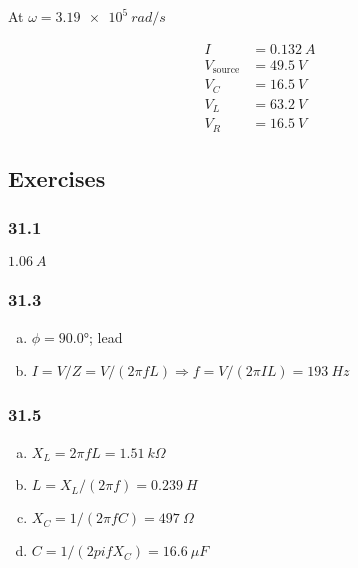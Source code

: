 \documentclass{article}
\begin{document}
\begin{enumerate}[(a)]
        At $\omega = \qty{3.19e5}{rad/s}$

        \begin{align*}
          I               & = \qty{0.132}{A} \\
          V_\text{source} & = \qty{49.5}{V}  \\
          V_C             & = \qty{16.5}{V}  \\
          V_L             & = \qty{63.2}{V}  \\
          V_R             & = \qty{16.5}{V}
        \end{align*}
\end{enumerate}

\subsection{Exercises}

\subsubsection{31.1}

$\qty{1.06}{A}$

\subsubsection{31.3}

\begin{enumerate}[(a)]
  \item $\phi = \ang{90.0}$; lead

  \item $I = V / Z = V / (2 \pi f L) \Rightarrow f = V / (2 \pi I L) = \qty{193}{Hz}$
\end{enumerate}

\subsubsection{31.5}

\begin{enumerate}[(a)]
  \item $X_L = 2 \pi f L = \qty{1.51}{k \Omega}$

  \item $L = X_L / (2 \pi f) = \qty{0.239}{H}$

  \item $X_C = 1 / (2 \pi f C) = \qty{497}{\Omega}$

  \item $C = 1 / (2 pi f X_C) = \qty{16.6}{\mu F}$
\end{enumerate}
\end{document}
